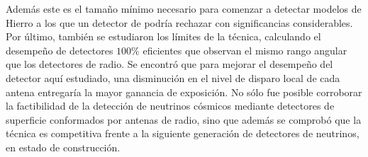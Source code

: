 Adem\'as este es el tama\~no m\'inimo necesario para comenzar a detectar modelos de Hierro a los que un detector de  podr\'ia rechazar con significancias considerables.
Por \'ultimo, tambi\'en se estudiaron los l\'imites de la t\'ecnica, calculando el desempe\~no de detectores $100\%$ eficientes que observan el mismo rango angular que los detectores de radio.
Se encontr\'o que para mejorar el desempe\~no del detector aqu\'i estudiado, una disminuci\'on en el nivel de disparo local de cada antena entregar\'ia la mayor ganancia de exposici\'on.
No s\'olo fue posible corroborar la factibilidad de la detecci\'on de neutrinos c\'osmicos mediante detectores de superficie conformados por antenas de radio, sino que adem\'as se comprob\'o que la t\'ecnica es competitiva frente a la siguiente generaci\'on de detectores de neutrinos, en estado de construcci\'on.
